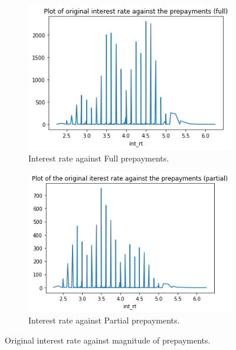     \begin{figure}[H]
        \centering
        \begin{subfigure}{0.45\textwidth}
            \includegraphics[width=\linewidth]{Figures/int_rt againts Full prepayments.png}
            \caption{
                Interest rate against Full prepayments.
                }
            \label{model_int_rt_against_full_prepayment}
        \end{subfigure}
        \begin{subfigure}{0.45\textwidth}
            \includegraphics[width=\linewidth]{Figures/int_rt againts Partial prepayments.png}
            \caption{
                Interest rate against Partial prepayments.
                }
            \label{model_int_rt_against_partial_prepayment}
        \end{subfigure}
        \caption{
            Original interest rate against magnitude of prepayments.
            }
        \label{model_int_rt_against_prepayment}
    \end{figure}
        
